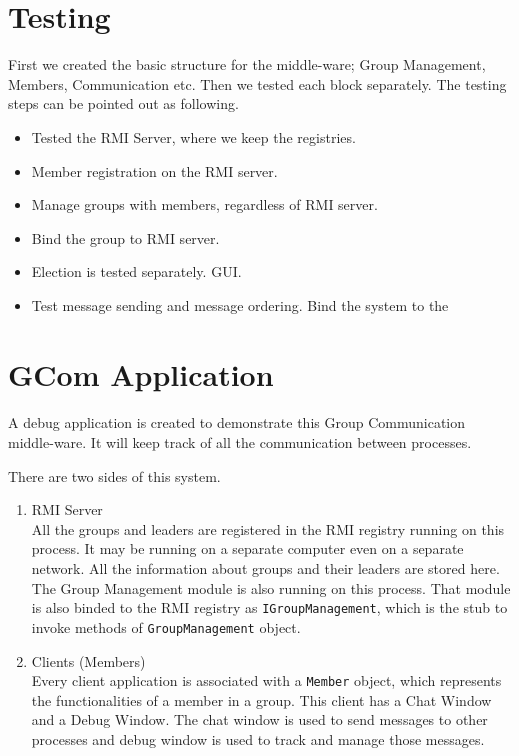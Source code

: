 \documentclass[a4paper,english,twoside]{article}
\begin{document}
\section{Testing}
First we created the basic structure for the middle-ware; Group Management, Members, Communication etc. Then we tested each block separately. The testing steps can be pointed out as following.

\begin{itemize}
\item Tested the RMI Server, where we keep the registries.
\item Member registration on the RMI server.
\item Manage groups with members, regardless of RMI server.
\item Bind the group to RMI server.
\item Election is tested separately. GUI.
\item Test message sending and message ordering.
\Item Bind the system to the
\paragraph{}
\end{itemize}

\newpage
\section{GCom Application}
\paragraph{}
A debug application is created to demonstrate this Group Communication middle-ware. It will keep track of all the communication between processes.

\vspace*{5mm}
\noindent
There are two sides of this system.

\begin{enumerate}
\item RMI Server\\
All the groups and leaders are registered in the RMI registry running on this process. It may be running on a separate computer even on a separate network. All the information about groups and their leaders are stored here. The Group Management module is also running on this process. That module is also binded to the RMI registry as \texttt{IGroupManagement}, which is the stub to invoke methods of \texttt{GroupManagement} object.

\item Clients (Members)\\
Every client application is associated with a \texttt{Member} object, which represents the functionalities of a member in a group. This client has a Chat Window and a Debug Window. The chat window is used to send messages to other processes and debug window is used to track and manage those messages.
\end{enumerate}
\end{document}

